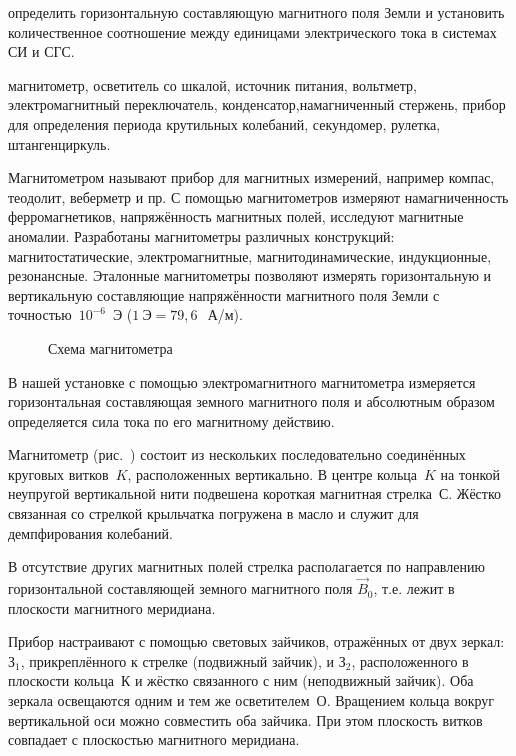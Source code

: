 
\begin{lab:aim}
    определить горизонтальную составляющую магнитного поля Земли и установить количественное соотношение между единицами электрического тока в системах СИ и СГС.
\end{lab:aim}

\begin{lab:equipment}
    магнитометр, осветитель со шкалой, источник питания, вольтметр, электромагнитный переключатель, конденсатор,намагниченный стержень, прибор для определения периода крутильных колебаний, секундомер, рулетка, штангенциркуль.
\end{lab:equipment}


Магнитометром называют прибор для магнитных измерений, например компас, теодолит, веберметр и пр. С помощью
магнитометров измеряют намагниченность ферромагнетиков, напряжённость магнитных полей, исследуют магнитные аномалии.
Разработаны магнитометры различных конструкций: магнитостатические, электромагнитные, магнитодинамические, индукционные,
резонансные. Эталонные магнитометры позволяют измерять горизонтальную и вертикальную составляющие напряжённости
магнитного поля Земли с точностью~$10^{-6}$~Э ($1~\text{Э}=79,6~$~А/м).

\begin{wrapfigure}{r}{0.4\textwidth}
	\caption{Схема магнитометра}
\end{wrapfigure}

В нашей установке с помощью электромагнитного магнитометра измеряется горизонтальная составляющая земного магнитного
поля и абсолютным образом определяется сила тока по его магнитному действию.

\experiment Магнитометр (рис.~) состоит из нескольких последовательно соединённых круговых витков~$K$, расположенных
вертикально. В центре кольца~$K$ на тонкой неупругой вертикальной нити подвешена короткая магнитная стрелка~С. Жёстко
связанная со стрелкой крыльчатка погружена в масло и служит для демпфирования колебаний.

В отсутствие других магнитных полей стрелка располагается по направлению горизонтальной составляющей земного магнитного
поля $\vec{B}_0$, т.е. лежит в плоскости магнитного меридиана.

Прибор настраивают с помощью световых зайчиков, отражённых от двух зеркал: $З_1$, прикреплённого к стрелке (подвижный
зайчик), и $З_2$, расположенного в плоскости кольца~К и жёстко связанного с ним (неподвижный зайчик). Оба зеркала
освещаются одним и тем же осветителем~О. Вращением кольца вокруг вертикальной оси можно совместить оба зайчика. При этом
плоскость витков совпадает с плоскостью магнитного меридиана.

